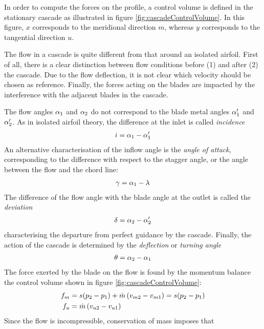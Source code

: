 In order to compute the forces on the profile, a control volume is
defined in the stationary cascade as illustrated in figure
\ref{fig:cascadeControlVolume}. In this figure, $x$ corresponds to the
meridional direction $m$, whereas $y$ corresponds to the tangential
direction $u$.  

The flow in a cascade is quite different from that around an isolated
airfoil. First of all, there is a clear distinction between flow
conditions before (1) and after (2) the cascade. Due to the flow
deflection, it is not clear which velocity should be chosen as
reference. Finally, the forces acting on the blades are impacted by
the interference with the adjacent blades in the cascade.

The flow angles $\alpha_1$ and $\alpha_2$ do not correspond
to the blade metal angles $\alpha^\prime_1$ and $\alpha^\prime_2$. As in
isolated airfoil theory, the difference at the inlet is called
\emph{incidence}
\begin{align*}
  i = \alpha_1 - \alpha^\prime_1
\end{align*}
An alternative characterisation of the inflow angle is the \emph{angle
  of attack}, corresponding to the difference with respect to the
stagger angle, or the angle between the flow and the chord line:
\begin{align*}
  \gamma = \alpha_1 - \lambda
\end{align*}
The difference of the flow angle with the blade angle at the outlet is
called the \emph{deviation}
\begin{align*}
  \delta = \alpha_2 - \alpha^\prime_2
\end{align*}
characterising the departure from perfect guidance by the cascade.
Finally, the action of the cascade is determined by the
\emph{deflection} or \emph{turning angle}
\begin{align*}
  \theta = \alpha_2 - \alpha_1
\end{align*}
The force exerted by the blade on the flow is found by the momentum
balance the control volume shown in figure
\ref{fig:cascadeControlVolume}:
\begin{align*}
  f_m &= s (p_2 - p_1) +
  \dot m \left(v_{m2} - v_{m1}\right) = s (p_2 - p_1) \\
  f_{u} &= \dot m \left(v_{u 2} - v_{u 1}\right)
\end{align*}
Since the flow is incompressible, conservation of mass imposes that
